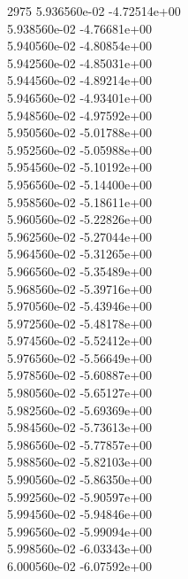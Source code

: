 2975	5.936560e-02	-4.72514e+00	\\ 	5.938560e-02	-4.76681e+00	\\ 	5.940560e-02	-4.80854e+00	\\ 	5.942560e-02	-4.85031e+00	\\ 	5.944560e-02	-4.89214e+00	\\ 	5.946560e-02	-4.93401e+00	\\ 	5.948560e-02	-4.97592e+00	\\ 	5.950560e-02	-5.01788e+00	\\ 	5.952560e-02	-5.05988e+00	\\ 	5.954560e-02	-5.10192e+00	\\ 	5.956560e-02	-5.14400e+00	\\ 	5.958560e-02	-5.18611e+00	\\ 	5.960560e-02	-5.22826e+00	\\ 	5.962560e-02	-5.27044e+00	\\ 	5.964560e-02	-5.31265e+00	\\ 	5.966560e-02	-5.35489e+00	\\ 	5.968560e-02	-5.39716e+00	\\ 	5.970560e-02	-5.43946e+00	\\ 	5.972560e-02	-5.48178e+00	\\ 	5.974560e-02	-5.52412e+00	\\ 	5.976560e-02	-5.56649e+00	\\ 	5.978560e-02	-5.60887e+00	\\ 	5.980560e-02	-5.65127e+00	\\ 	5.982560e-02	-5.69369e+00	\\ 	5.984560e-02	-5.73613e+00	\\ 	5.986560e-02	-5.77857e+00	\\ 	5.988560e-02	-5.82103e+00	\\ 	5.990560e-02	-5.86350e+00	\\ 	5.992560e-02	-5.90597e+00	\\ 	5.994560e-02	-5.94846e+00	\\ 	5.996560e-02	-5.99094e+00	\\ 	5.998560e-02	-6.03343e+00	\\ 	6.000560e-02	-6.07592e+00	\\ \hline
